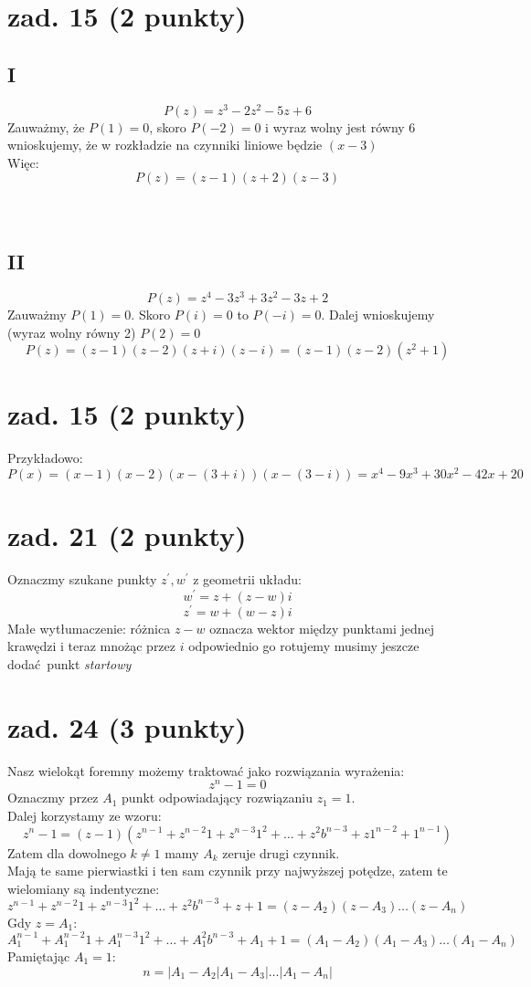 \documentclass{article}
\begin{document}
\section{zad. 15 (2 punkty)}
\subsection*{I}
$$
P(z) = z^3 - 2z^2 - 5z + 6
$$
Zauważmy, że $P(1) = 0$, skoro $P(-2) = 0$ i wyraz wolny jest równy $6$ wnioskujemy, że w rozkładzie na czynniki liniowe będzie $(x-3)$
\\Więc:
$$
P(z) = (z-1)(z+2)(z-3)
$$
\\\\
\subsection*{II}
$$
P(z) = z^4 - 3z^3 + 3z^2 - 3z + 2
$$
Zauważmy $P(1) = 0$. Skoro $P(i) = 0$ to $P(-i) = 0$. Dalej wnioskujemy (wyraz wolny równy 2) $P(2) = 0$
$$
P(z) = (z-1)(z-2)(z+i)(z-i) = (z-1)(z-2)(z^2+1)
$$

\section{zad. 15 (2 punkty)}
Przykładowo:
$$
P(x) = (x-1)(x-2)(x - (3+i))(x - (3 - i)) = x^4 - 9x^3+30x^2-42x+20
$$
\section{zad. 21 (2 punkty)}
Oznaczmy szukane punkty $z^\prime, w^\prime$ z geometrii układu:
$$
w^\prime = z + (z-w)i
$$
$$
z^\prime = w + (w-z)i
$$
Małe wytłumaczenie: różnica $z-w$ oznacza wektor między punktami jednej krawędzi i teraz mnożąc przez $i$ odpowiednio go rotujemy musimy jeszcze dodać punkt \textit {startowy}
\section{zad. 24 (3 punkty)}
Nasz wielokąt foremny możemy traktować jako rozwiązania wyrażenia:
$$
z^n - 1 =0
$$
Oznaczmy przez $A_1$ punkt odpowiadający rozwiązaniu $z_1 = 1$.\\
Dalej korzystamy ze wzoru:
$$
z^n - 1 = (z-1)\left(z^{n-1}+z^{n-2}1+z^{n-3}1^2+\dots+z^2b^{n-3}+z1^{n-2}+1^{n-1}\right)
$$
Zatem dla dowolnego $k \neq 1$ mamy $A_k$ zeruje drugi czynnik.\\
Mają te same pierwiastki i ten sam czynnik przy najwyższej potędze, zatem te wielomiany są indentyczne:
$$
z^{n-1}+z^{n-2}1+z^{n-3}1^2+\dots+z^2b^{n-3}+z+1 = (z-A_2)(z-A_3)\dots(z-A_n)
$$
Gdy $z = A_1$:
$$
A_1^{n-1}+A_1^{n-2}1+A_1^{n-3}1^2+\dots+A_1^2b^{n-3}+A_1+1 = (A_1-A_2)(A_1-A_3)\dots(A_1-A_n)
$$
Pamiętając $A_1 = 1$:
$$
n = |A_1-A_2|A_1-A_3|\dots|A_1-A_n|
$$
\end{document}
